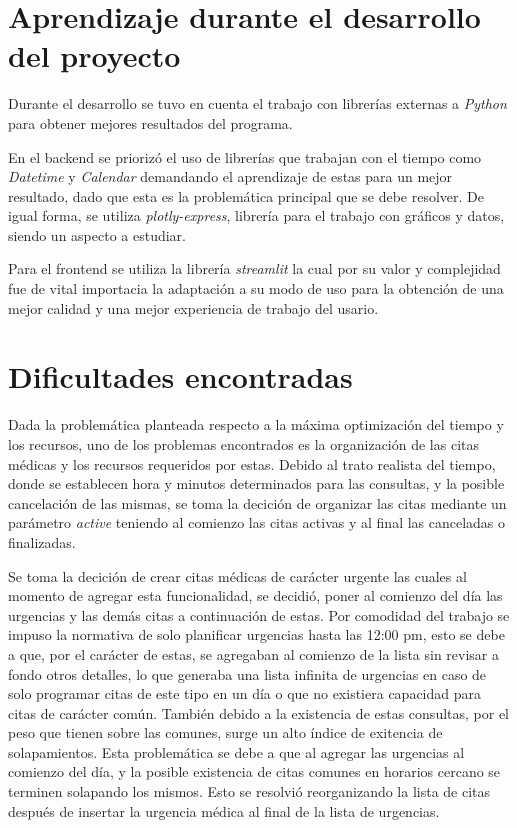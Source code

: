\documentclass[12pt]{article}
\begin{document}
\section{Aprendizaje durante el desarrollo del proyecto}

Durante el desarrollo se tuvo en cuenta el trabajo con librerías externas a \textit{Python} para obtener mejores resultados del programa.

En el backend se priorizó el uso de librerías que trabajan con el tiempo como \textit{Datetime} y \textit{Calendar} demandando el aprendizaje de estas para un mejor resultado, dado que esta es la problemática principal que se debe resolver. De igual forma, se utiliza \textit{plotly-express}, librería para el trabajo con gráficos y datos, siendo un aspecto a estudiar.

Para el frontend se utiliza la librería \textit{streamlit} la cual por su valor y complejidad fue de vital importacia la adaptación a su modo de uso para la obtención de una mejor calidad y una mejor experiencia de trabajo del usario.

\section{Dificultades encontradas}

Dada la problemática planteada respecto a la máxima optimización del tiempo y los recursos, uno de los problemas encontrados es la organización de las citas médicas y los recursos requeridos por estas. Debido al trato realista del tiempo, donde se establecen hora y minutos determinados para las consultas, y la posible cancelación de las mismas, se toma la decición de organizar las citas mediante un parámetro \textit{active} teniendo al comienzo las citas activas y al final las canceladas o finalizadas.

Se toma la decición de crear citas médicas de carácter urgente las cuales al momento de agregar esta funcionalidad, se decidió, poner al comienzo del día las urgencias y las demás citas a continuación de estas. Por comodidad del trabajo se impuso la normativa de solo planificar urgencias hasta las 12:00 pm, esto se debe a que, por el carácter de estas, se agregaban al comienzo de la lista sin revisar a fondo otros detalles, lo que generaba una lista infinita de urgencias en caso de solo programar citas de este tipo en un día o que no existiera capacidad para citas de carácter común. También debido a la existencia de estas consultas, por el peso que tienen sobre las comunes, surge un alto índice de exitencia de solapamientos. Esta problemática se debe a que al agregar las urgencias al comienzo del día, y la posible existencia de citas comunes en horarios cercano se terminen solapando los mismos. Esto se resolvió reorganizando la lista de citas después de insertar la urgencia médica al final de la lista de urgencias.
 
\end{document}
